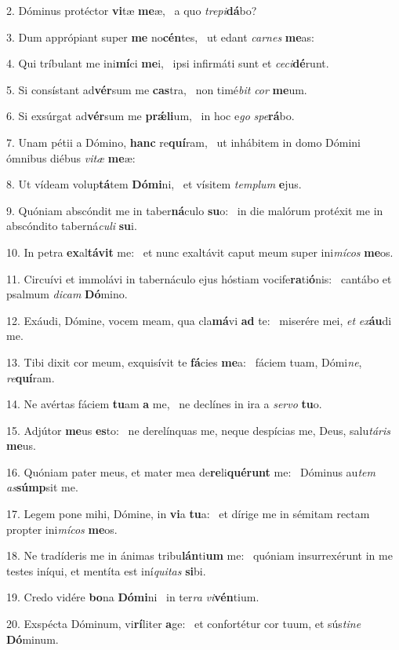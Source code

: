 2. Dóminus protéctor \textbf{vi}tæ \textbf{me}æ, \ast\  a quo \textit{tre}\textit{pi}\textbf{dá}bo?\

3. Dum apprópiant super \textbf{me} no\textbf{cén}tes, \ast\  ut edant \textit{car}\textit{nes} \textbf{me}as:\

4. Qui tríbulant me ini\textbf{mí}ci \textbf{me}i, \ast\  ipsi infirmáti sunt et \textit{ce}\textit{ci}\textbf{dé}runt.\

5. Si consístant ad\textbf{vér}sum me \textbf{cas}tra, \ast\  non timé\textit{bit} \textit{cor} \textbf{me}um.\

6. Si exsúrgat ad\textbf{vér}sum me \textbf{prǽ}\textbf{li}um, \ast\  in hoc e\textit{go} \textit{spe}\textbf{rá}bo.\

7. Unam pétii a Dómino, \textbf{hanc} re\textbf{quí}ram, \ast\  ut inhábitem in domo Dómini ómnibus diébus \textit{vi}\textit{tæ} \textbf{me}æ:\

8. Ut vídeam volup\textbf{tá}tem \textbf{Dó}\textbf{mi}ni, \ast\  et vísitem \textit{tem}\textit{plum} \textbf{e}jus.\

9. Quóniam abscóndit me in taber\textbf{ná}culo \textbf{su}o: \ast\  in die malórum protéxit me in abscóndito taberná\textit{cu}\textit{li} \textbf{su}i.\

10. In petra \textbf{ex}al\textbf{tá}\textbf{vit} me: \ast\  et nunc exaltávit caput meum super ini\textit{mí}\textit{cos} \textbf{me}os.\

11. Circuívi et immolávi in tabernáculo ejus hóstiam vocife\textbf{ra}ti\textbf{ó}nis: \ast\  cantábo et psalmum \textit{di}\textit{cam} \textbf{Dó}mino.\

12. Exáudi, Dómine, vocem meam, qua cla\textbf{má}vi \textbf{ad} te: \ast\  miserére mei, \textit{et} \textit{ex}\textbf{áu}di me.\

13. Tibi dixit cor meum, exquisívit te \textbf{fá}cies \textbf{me}a: \ast\  fáciem tuam, Dómi\textit{ne}, \textit{re}\textbf{quí}ram.\

14. Ne avértas fáciem \textbf{tu}am \textbf{a} me, \ast\  ne declínes in ira a \textit{ser}\textit{vo} \textbf{tu}o.\

15. Adjútor \textbf{me}us \textbf{es}to: \ast\  ne derelínquas me, neque despícias me, Deus, salu\textit{tá}\textit{ris} \textbf{me}us.\

16. Quóniam pater meus, et mater mea de\textbf{re}li\textbf{qué}\textbf{runt} me: \ast\  Dóminus au\textit{tem} \textit{as}\textbf{súmp}sit me.\

17. Legem pone mihi, Dómine, in \textbf{vi}a \textbf{tu}a: \ast\  et dírige me in sémitam rectam propter ini\textit{mí}\textit{cos} \textbf{me}os.\

18. Ne tradíderis me in ánimas tribu\textbf{lán}ti\textbf{um} me: \ast\  quóniam insurrexérunt in me testes iníqui, et mentíta est iní\textit{qui}\textit{tas} \textbf{si}bi.\

19. Credo vidére \textbf{bo}na \textbf{Dó}\textbf{mi}ni \ast\  in ter\textit{ra} \textit{vi}\textbf{vén}tium.\

20. Exspécta Dóminum, vi\textbf{rí}liter \textbf{a}ge: \ast\  et confortétur cor tuum, et sús\textit{ti}\textit{ne} \textbf{Dó}minum.\

